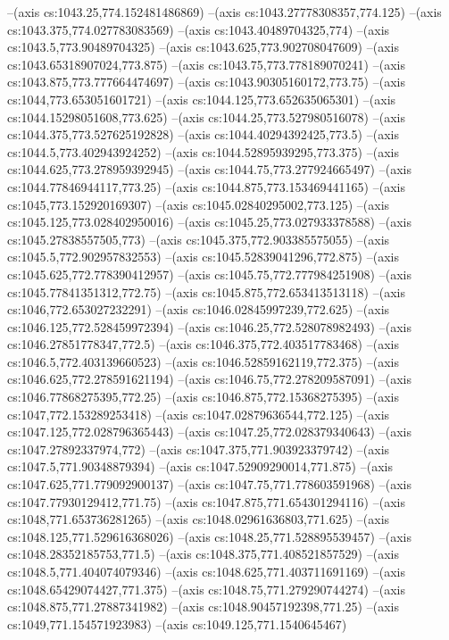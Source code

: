 --(axis cs:1043.25,774.152481486869)
--(axis cs:1043.27778308357,774.125)
--(axis cs:1043.375,774.027783083569)
--(axis cs:1043.40489704325,774)
--(axis cs:1043.5,773.90489704325)
--(axis cs:1043.625,773.902708047609)
--(axis cs:1043.65318907024,773.875)
--(axis cs:1043.75,773.778189070241)
--(axis cs:1043.875,773.777664474697)
--(axis cs:1043.90305160172,773.75)
--(axis cs:1044,773.653051601721)
--(axis cs:1044.125,773.652635065301)
--(axis cs:1044.15298051608,773.625)
--(axis cs:1044.25,773.527980516078)
--(axis cs:1044.375,773.527625192828)
--(axis cs:1044.40294392425,773.5)
--(axis cs:1044.5,773.402943924252)
--(axis cs:1044.52895939295,773.375)
--(axis cs:1044.625,773.278959392945)
--(axis cs:1044.75,773.277924665497)
--(axis cs:1044.77846944117,773.25)
--(axis cs:1044.875,773.153469441165)
--(axis cs:1045,773.152920169307)
--(axis cs:1045.02840295002,773.125)
--(axis cs:1045.125,773.028402950016)
--(axis cs:1045.25,773.027933378588)
--(axis cs:1045.27838557505,773)
--(axis cs:1045.375,772.903385575055)
--(axis cs:1045.5,772.902957832553)
--(axis cs:1045.52839041296,772.875)
--(axis cs:1045.625,772.778390412957)
--(axis cs:1045.75,772.777984251908)
--(axis cs:1045.77841351312,772.75)
--(axis cs:1045.875,772.653413513118)
--(axis cs:1046,772.653027232291)
--(axis cs:1046.02845997239,772.625)
--(axis cs:1046.125,772.528459972394)
--(axis cs:1046.25,772.528078982493)
--(axis cs:1046.27851778347,772.5)
--(axis cs:1046.375,772.403517783468)
--(axis cs:1046.5,772.403139660523)
--(axis cs:1046.52859162119,772.375)
--(axis cs:1046.625,772.278591621194)
--(axis cs:1046.75,772.278209587091)
--(axis cs:1046.77868275395,772.25)
--(axis cs:1046.875,772.15368275395)
--(axis cs:1047,772.153289253418)
--(axis cs:1047.02879636544,772.125)
--(axis cs:1047.125,772.028796365443)
--(axis cs:1047.25,772.028379340643)
--(axis cs:1047.27892337974,772)
--(axis cs:1047.375,771.903923379742)
--(axis cs:1047.5,771.90348879394)
--(axis cs:1047.52909290014,771.875)
--(axis cs:1047.625,771.779092900137)
--(axis cs:1047.75,771.778603591968)
--(axis cs:1047.77930129412,771.75)
--(axis cs:1047.875,771.654301294116)
--(axis cs:1048,771.653736281265)
--(axis cs:1048.02961636803,771.625)
--(axis cs:1048.125,771.529616368026)
--(axis cs:1048.25,771.528895539457)
--(axis cs:1048.28352185753,771.5)
--(axis cs:1048.375,771.408521857529)
--(axis cs:1048.5,771.404074079346)
--(axis cs:1048.625,771.403711691169)
--(axis cs:1048.65429074427,771.375)
--(axis cs:1048.75,771.279290744274)
--(axis cs:1048.875,771.27887341982)
--(axis cs:1048.90457192398,771.25)
--(axis cs:1049,771.154571923983)
--(axis cs:1049.125,771.1540645467)

